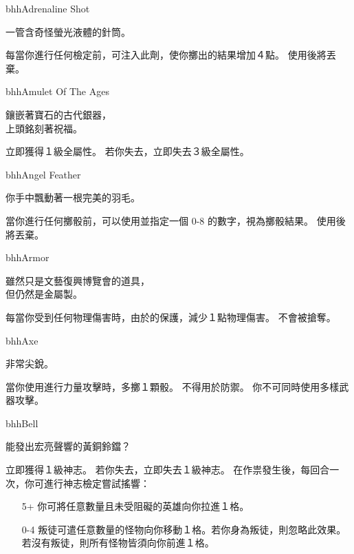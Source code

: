 
\begin{ItemCard}{bhh}{Adrenaline Shot}
  \begin{CardStory}
    一管含奇怪螢光液體的針筒。
  \end{CardStory}
  每當你進行任何檢定前，可注入此劑，使你擲出的結果增加４點。 \smallskip
  使用後將\ThisName{}丟棄。 \smallskip
\end{ItemCard}%
%
\begin{ItemCard}{bhh}{Amulet Of The Ages}
  \begin{CardStory}
    鑲嵌著寶石的古代銀器，\\
    上頭銘刻著祝福。
  \end{CardStory}
  立即獲得１級全屬性。\smallskip
  若你失去\ThisName{}，立即失去３級全屬性。\smallskip
\end{ItemCard}%
%
\begin{ItemCard}{bhh}{Angel Feather}
  \begin{CardStory}
    你手中飄動著一根完美的羽毛。
  \end{CardStory}
  當你進行任何擲骰前，可以使用\ThisName{}並指定一個 0-8 的數字，視為擲骰結果。\smallskip
  使用後將\ThisName{}丟棄。\smallskip
\end{ItemCard}%
%
\begin{ItemCard}{bhh}{Armor}
  \begin{CardStory}
    雖然只是文藝復興博覽會的道具，\\
    但仍然是金屬製。
  \end{CardStory}
  每當你受到任何物理傷害時，由於\ThisName{}的保護，減少１點物理傷害。\smallskip
  \ThisName{}不會被搶奪。\smallskip
\end{ItemCard}%
%
\begin{ItemCard}{bhh}{Axe}%
  \begin{CardStory}
    非常尖銳。
  \end{CardStory}
  當你使用\ThisName{}進行力量攻擊時，多擲１顆骰。\smallskip
  \ThisName{}不得用於防禦。\smallskip
  你不可同時使用多樣武器攻擊。\smallskip
\end{ItemCard}%
%
\begin{ItemCard}{bhh}{Bell}
  \begin{CardStory}
    能發出宏亮聲響的黃銅鈴鐺？
  \end{CardStory}
  立即獲得１級神志。\smallskip
  若你失去\ThisName{}，立即失去１級神志。\smallskip
  在作祟發生後，每回合一次，你可進行神志檢定嘗試搖響\ThisName{}：
  \begin{itemize}
    \item[5+] 你可將任意數量且未受阻礙的英雄向你拉進１格。
    \item[0-4] 叛徒可遣任意數量的怪物向你移動１格。若你身為叛徒，則忽略此效果。若沒有叛徒，則所有怪物皆須向你前進１格。
  \end{itemize}
\end{ItemCard}%
